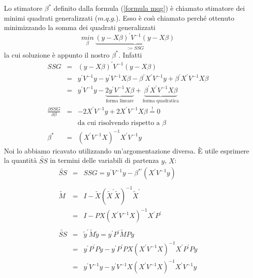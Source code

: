 \documentclass[a4paper]{report}
\newcounter{def}
\theoremstyle{remark}
\begin{document}
\begin{enumerate}
Lo stimatore $\beta ^{\ast }$ definito dalla formula (\ref{formula mqg}) 
\`{e} chiamato stimatore dei minimi quadrati generalizzati ($m.q.g.$). Esso 
\`{e} cos\`{\i} chiamato perch\'{e} ottenuto minimizzando la somma dei
quadrati generalizzati 
\begin{equation}
\underset{\beta }{min}\ \underset{:=SSG}{\underbrace{(y-X\beta )^{\prime
}V^{-1}(y-X\beta )}}
\end{equation}%
la cui soluzione \`{e} appunto il nostro $\beta ^{\ast }$. Infatti%
\begin{eqnarray*}
SSG &=&(y-X\beta )^{\prime }V^{-1}(y-X\beta ) \\
&=&y^{\prime }V^{-1}y-y^{\prime }V^{-1}X\beta -\beta ^{\prime }X^{\prime
}V^{-1}y+\beta ^{\prime }X^{\prime }V^{-1}X\beta \\
&=&y^{\prime }V^{-1}y-\underset{\text{forma lineare}}{\underbrace{2y^{\prime
}V^{-1}X\beta }}+\underset{\text{forma quadratica}}{\underbrace{\beta
^{\prime }X^{\prime }V^{-1}X\beta }} \\
\frac{\partial SSG}{\partial \beta } &=&-2X^{\prime }V^{-1}y+2X^{\prime
}V^{-1}X\beta \overset{!}{=}0 \\
&&\text{da cui risolvendo rispetto a }\beta \\
\beta ^{\ast } &=&(X^{\prime }V^{-1}X)^{-1}X^{\prime }V^{-1}y
\end{eqnarray*}%
Noi lo abbiamo ricavato utilizzando un'argomentazione diversa. \`{E} utile
esprimere la quantit\`{a} $\tilde{SS}$ in termini delle variabili di
partenza $y$, $X$: 
\begin{eqnarray*}
\tilde{SS} &=&SSG=y^{\prime }V^{-1}y-{\beta ^{\ast \prime }}(X^{\prime
}V^{-1}y) \\
&& \\
\tilde{M} &=&I-\tilde{X}(\tilde{X}^{\prime }\tilde{X})^{-1}\tilde{X}^{\prime
} \\
&=&I-PX(X^{\prime }V^{-1}X)^{-1}X^{\prime }P^{\prime } \\
&& \\
\tilde{SS} &=&\tilde{y}^{\prime }\tilde{M}\tilde{y}=y^{\prime }P^{\prime }%
\tilde{M}Py \\
&=&y^{\prime }P^{\prime }Py-y^{\prime }P^{\prime }PX(X^{\prime
}V^{-1}X)^{-1}X^{\prime }P^{\prime }Py \\
&=&y^{\prime }V^{-1}y-y^{\prime }V^{-1}X(X^{\prime }V^{-1}X)^{-1}X^{\prime
}V^{-1}y
\end{eqnarray*}


\end{enumerate}
\end{document}
